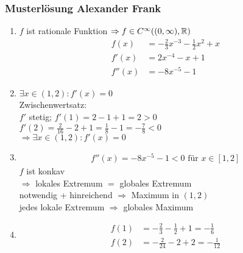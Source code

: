 \subsubsection{Musterlösung Alexander Frank}
\begin{enumerate}[label = \alph*)]
    \item $f$ ist rationale Funktion $\Rightarrow f \in C^{\infty}((0, \infty), \mathbb R)$
    \begin{align*}
        f(x) &= - \frac{2}{3} x ^{-3} - \frac{1}{2} x ^2 + x\\
        f'(x) &= 2x^{-4} - x +1\\
        f''(x) &= - 8 x ^{-5} - 1
    \end{align*}
    \item $\exists x \in (1, 2): f'(x) = 0$\\
    Zwischenwertsatz: \\
    $f'$ stetig; $f'(1) = 2 - 1 +1 = 2 > 0$\\
    $f'(2) = \frac{2}{16} - 2 + 1 = \frac{1}{8} - 1 = - \frac{7}{8} < 0$\\
    $\Rightarrow \exists x \in (1, 2): f'(x) = 0$
    \item \begin{align*}
        f''(x) = - 8 x^{-5} - 1 < 0 \text{ für } x \in [1, 2]
    \end{align*}
    $f$ ist konkav\\
    $\Rightarrow$ lokales Extremum $=$ globales Extremum\\
    notwendig + hinreichend $\Rightarrow$ Maximum in $(1, 2)$\\
    jedes lokale Extremum $\Rightarrow$ globales Maximum
    \item 
    \begin{align*}
        f(1) &= - \frac{2}{3} - \frac{1}{2} + 1  =  - \frac{1}{6}\\
        f(2) &= - \frac{2}{24} - 2 + 2 = - \frac{1}{12}
    \end{align*}
\end{enumerate}